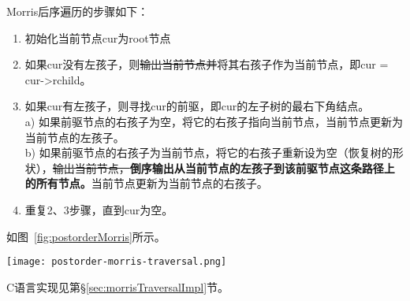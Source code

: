 Morris后序遍历的步骤如下：
\begin{enumerate}
\item 初始化当前节点cur为root节点
\item 如果cur没有左孩子，则\sout{输出当前节点并}将其右孩子作为当前节点，即cur = cur->rchild。
\item 如果cur有左孩子，则寻找cur的前驱，即cur的左子树的最右下角结点。\\
   a) 如果前驱节点的右孩子为空，将它的右孩子指向当前节点，当前节点更新为当前节点的左孩子。\\
   b) 如果前驱节点的右孩子为当前节点，将它的右孩子重新设为空（恢复树的形状），\sout{输出当前节点，}\textbf{倒序输出从当前节点的左孩子到该前驱节点这条路径上的所有节点。}当前节点更新为当前节点的右孩子。
\item 重复2、3步骤，直到cur为空。
\end{enumerate}
如图~\ref{fig:postorderMorris}所示。

\begin{center}
\texttt{[image: postorder-morris-traversal.png]} \\
\label{fig:postorderMorris}
\end{center}

C语言实现见第\S\ref{sec:morrisTraversalImpl}节。


